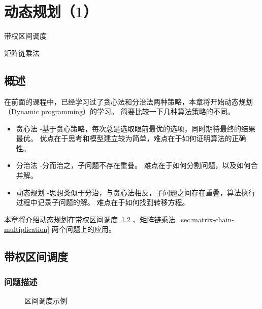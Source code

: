 \chapter{动态规划（1）}

\begin{introduction}
	\item 带权区间调度
	\item 矩阵链乘法
\end{introduction}

\section{概述}
在前面的课程中，已经学习过了贪心法和分治法两种策略，本章将开始动态规划（Dynamic programming）的学习。
简要比较一下几种算法策略的不同。

\begin{itemize}
	\item 贪心法 -基于贪心策略，每次总是选取眼前最优的选项，同时期待最终的结果最优。
	      优点在于思考和模型建立较为简单，难点在于如何证明算法的正确性。
	\item 分治法 -分而治之，子问题不存在重叠。
	      难点在于如何分割问题，以及如何合并解。
	\item 动态规划 -思想类似于分治，与贪心法相反，子问题之间存在重叠，算法执行过程中记录子问题的解。
	      难点在于如何找到转移方程。
\end{itemize}

本章将介绍动态规划在带权区间调度~\ref{sec:weighted-interval-scheduling} 、矩阵链乘法~\ref{sec:matrix-chain-multiplication} 两个问题上的应用。

\section{带权区间调度}\label{sec:weighted-interval-scheduling}

\subsection{问题描述}

\begin{figure}[hbt!]
	\centering
	\caption{区间调度示例}\label{fig:wis-picture-1}
\end{figure}

